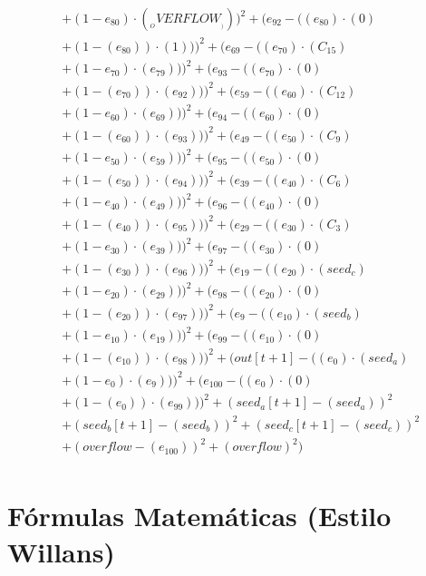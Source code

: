 \documentclass[10pt, a4paper]{article}
\begin{document}
\begin{small}
\begin{align*}
& + (1 - e_{80})  \cdot  (__OVERFLOW__)))^{2} + (e_{92} - ((e_{80}) \cdot (0) \\
& + (1 - (e_{80})) \cdot (1)))^{2} + (e_{69} - ((e_{70})  \cdot  (C_{15}) \\
& + (1 - e_{70})  \cdot  (e_{79})))^{2} + (e_{93} - ((e_{70}) \cdot (0) \\
& + (1 - (e_{70})) \cdot (e_{92})))^{2} + (e_{59} - ((e_{60})  \cdot  (C_{12}) \\
& + (1 - e_{60})  \cdot  (e_{69})))^{2} + (e_{94} - ((e_{60}) \cdot (0) \\
& + (1 - (e_{60})) \cdot (e_{93})))^{2} + (e_{49} - ((e_{50})  \cdot  (C_{9}) \\
& + (1 - e_{50})  \cdot  (e_{59})))^{2} + (e_{95} - ((e_{50}) \cdot (0) \\
& + (1 - (e_{50})) \cdot (e_{94})))^{2} + (e_{39} - ((e_{40})  \cdot  (C_{6}) \\
& + (1 - e_{40})  \cdot  (e_{49})))^{2} + (e_{96} - ((e_{40}) \cdot (0) \\
& + (1 - (e_{40})) \cdot (e_{95})))^{2} + (e_{29} - ((e_{30})  \cdot  (C_{3}) \\
& + (1 - e_{30})  \cdot  (e_{39})))^{2} + (e_{97} - ((e_{30}) \cdot (0) \\
& + (1 - (e_{30})) \cdot (e_{96})))^{2} + (e_{19} - ((e_{20})  \cdot  (seed_c) \\
& + (1 - e_{20})  \cdot  (e_{29})))^{2} + (e_{98} - ((e_{20}) \cdot (0) \\
& + (1 - (e_{20})) \cdot (e_{97})))^{2} + (e_{9} - ((e_{10})  \cdot  (seed_b) \\
& + (1 - e_{10})  \cdot  (e_{19})))^{2} + (e_{99} - ((e_{10}) \cdot (0) \\
& + (1 - (e_{10})) \cdot (e_{98})))^{2} + (out[t+1] - ((e_{0})  \cdot  (seed_a) \\
& + (1 - e_{0})  \cdot  (e_{9})))^{2} + (e_{100} - ((e_{0}) \cdot (0) \\
& + (1 - (e_{0})) \cdot (e_{99})))^{2} + (seed_a[t+1] - (seed_a))^{2} \\
& + (seed_b[t+1] - (seed_b))^{2} + (seed_c[t+1] - (seed_c))^{2} \\
& + (overflow - (e_{100}))^{2} + (overflow)^{2}) \\
\end{align*}
\end{small}\part{Fórmulas Matemáticas (Estilo Willans)}
\end{document}
